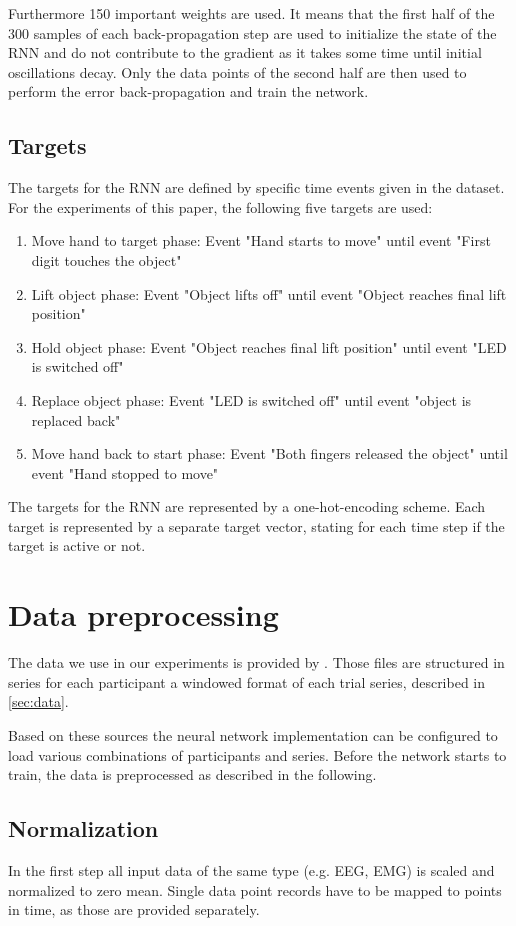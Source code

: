 \documentclass{article} %
\begin{document}
Furthermore 150 important weights are used. It means that the first half of the 300 samples of each back-propagation step are used to initialize the state of the RNN and do not contribute to the gradient as it takes some time until initial oscillations decay. Only the data points of the second half are then used to perform the error back-propagation and train the network.

\subsection{Targets}
The targets for the RNN are defined by specific time events given in the dataset. For the experiments of this paper, the following five targets are used:
\begin{enumerate}
	\item Move hand to target phase: Event "Hand starts to move"  until event "First digit touches the object"
	\item Lift object phase: Event "Object lifts off" until event "Object reaches final lift position"
	\item Hold object phase: Event "Object reaches final lift position" until event "LED is switched off"
	\item Replace object phase: Event "LED is switched off" until event "object is replaced back"
	\item Move hand back to start phase: Event "Both fingers released the object" until event "Hand stopped to move"
\end{enumerate}
The targets for the RNN are represented by a one-hot-encoding scheme. Each target is represented by a separate target vector, stating for each time step if the target is active or not.

\section{Data preprocessing}
The data we use in our experiments is provided by \cite{nature}.
Those files are structured in series for each participant a windowed format of each trial series, described in \ref{sec:data}.

Based on these sources the neural network implementation can be configured to load various combinations of participants and series.
Before the network starts to train, the data is preprocessed as described in the following.

\subsection{Normalization}
In the first step all input data of the same type (e.g. EEG, EMG) is scaled and normalized to zero mean.
Single data point records have to be mapped to points in time, as those are provided separately.
\end{document}
